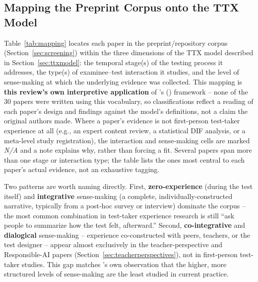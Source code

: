 \documentclass[11pt]{article}
\begin{document}
\subsection{Mapping the Preprint Corpus onto the TTX Model}
\label{sec:mapping}

Table~\ref{tab:mapping} locates each paper in the preprint/repository corpus (Section~\ref{sec:screening}) within the three dimensions of the TTX model described in Section~\ref{sec:ttxmodel}: the temporal stage(s) of the testing process it addresses, the type(s) of examinee--test interaction it studies, and the level of sense-making at which the underlying evidence was collected. This mapping is \textbf{this review's own interpretive application} of \citeauthor{araneda2025ttxmodel}'s (\citeyear{araneda2025ttxmodel}) framework -- none of the 30 papers were written using this vocabulary, so classifications reflect a reading of each paper's design and findings against the model's definitions, not a claim the original authors made. Where a paper's evidence is not first-person test-taker experience at all (e.g., an expert content review, a statistical DIF analysis, or a meta-level study registration), the interaction and sense-making cells are marked \emph{N/A} and a note explains why, rather than forcing a fit. Several papers span more than one stage or interaction type; the table lists the ones most central to each paper's actual evidence, not an exhaustive tagging.

Two patterns are worth naming directly. First, \textbf{zero-experience} (during the test itself) and \textbf{integrative} sense-making (a complete, individually-constructed narrative, typically from a post-hoc survey or interview) dominate the corpus -- the most common combination in test-taker experience research is still ``ask people to summarize how the test felt, afterward.'' Second, \textbf{co-integrative} and \textbf{dialogical} sense-making -- experience co-constructed with peers, teachers, or the test designer -- appear almost exclusively in the teacher-perspective and Responsible-AI papers (Section~\ref{sec:teacherperspectives}), not in first-person test-taker studies. This gap matches \citeauthor{araneda2025ttxmodel}'s own observation that the higher, more structured levels of sense-making are the least studied in current practice.
\end{document}
